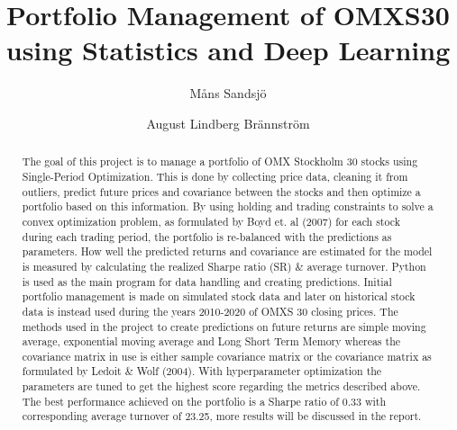 \documentclass[final]{LTHtwocol} %
\begin{document}
\begin{frontmatter}
\title{Portfolio Management of OMXS30 using Statistics and Deep Learning} %

\author[måns]{Måns Sandsjö}
\author[august]{August Lindberg Brännström}


\begin{abstract}
The goal of this project is to manage a portfolio of OMX Stockholm 30 stocks using Single-Period Optimization. This is done by collecting price data, cleaning it from outliers, predict future prices and covariance between the stocks and then optimize a portfolio based on this information. By using holding and trading constraints to solve a convex optimization problem, as formulated by Boyd et. al (2007) for each stock during each trading period, the portfolio is re-balanced with the predictions as parameters. How well the predicted returns and covariance are estimated for the model is measured by calculating the realized Sharpe ratio (SR) \& average turnover. Python is used as the main program for data handling and creating predictions. Initial portfolio management is made on simulated stock data and later on historical stock data is instead used during the years 2010-2020 of OMXS 30 closing prices. The methods used in the project to create predictions on future returns are simple moving average, exponential moving average and Long Short Term Memory whereas the covariance matrix in use is either sample covariance matrix or the covariance matrix as formulated by Ledoit \& Wolf (2004). With hyperparameter optimization the parameters are tuned to get the highest score regarding the metrics described above. The best performance achieved on the portfolio is a Sharpe ratio of 0.33 with corresponding average turnover of 23.25, more results will be discussed in the report. 

\end{abstract}

\end{frontmatter}

\end{document}
